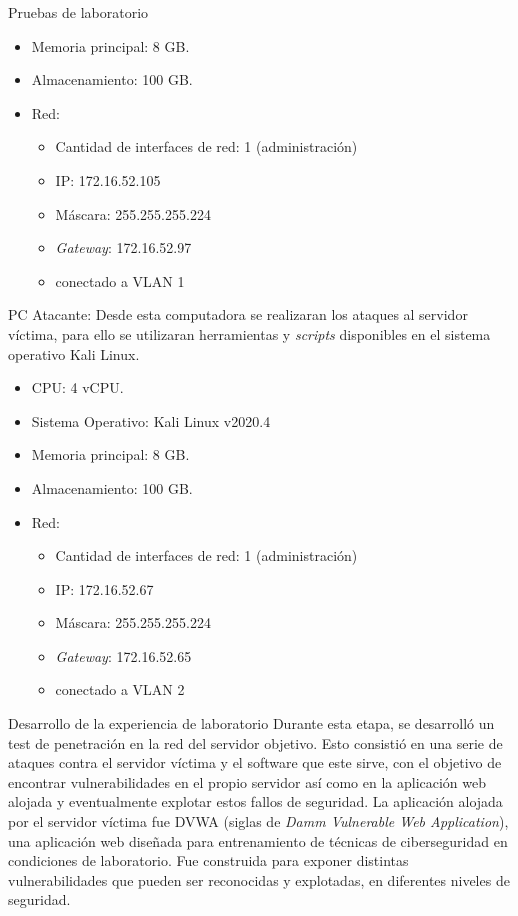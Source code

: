 \begin{section}{Pruebas de laboratorio}
\begin{itemize}
                \item Memoria principal: 8 GB.
                \item Almacenamiento: 100 GB.
                \item Red:
                \begin{itemize}
                    \item Cantidad de interfaces de red: 1 (administración)
                    \item IP: 172.16.52.105
                    \item Máscara: 255.255.255.224
                    \item \textit{Gateway}: 172.16.52.97
                    \item conectado a VLAN 1
                \end{itemize}
            \end{itemize}
PC Atacante:
Desde esta computadora se realizaran los ataques al servidor víctima, para ello se utilizaran herramientas y \textit{scripts} disponibles en el sistema operativo Kali Linux.
    \begin{itemize}
            \item CPU: 4 vCPU.
            \item Sistema Operativo: Kali Linux v2020.4
            \item Memoria principal: 8 GB.
            \item Almacenamiento: 100 GB.
            \item Red:
            \begin{itemize}
                    \item Cantidad de interfaces de red: 1 (administración)
                    \item IP: 172.16.52.67
                    \item Máscara: 255.255.255.224
                    \item \textit{Gateway}: 172.16.52.65
                    \item conectado a VLAN 2
            \end{itemize}
        \end{itemize}
    \begin{subsection}{Desarrollo de la experiencia de laboratorio}
    Durante esta etapa, se desarrolló un test de penetración en la red del servidor objetivo. Esto consistió en una serie de ataques contra el servidor víctima y el software que este sirve, con el objetivo de encontrar vulnerabilidades en el propio servidor así como en la aplicación web alojada y eventualmente explotar estos fallos de seguridad. La aplicación alojada por el servidor víctima fue DVWA (siglas de \textit{Damm Vulnerable Web Application}), una aplicación web diseñada para entrenamiento de técnicas de ciberseguridad en condiciones de laboratorio. Fue construida para exponer distintas vulnerabilidades que pueden ser reconocidas y explotadas, en diferentes niveles de seguridad. 

\end{subsection}
\end{section}
